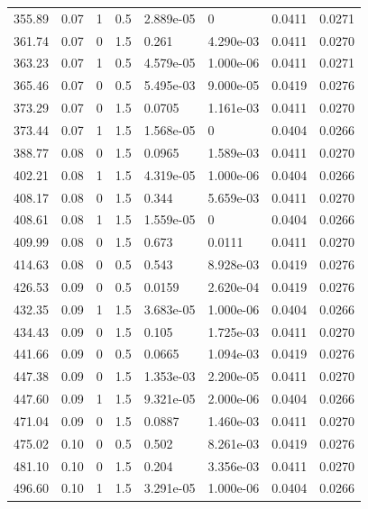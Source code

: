 \documentclass[preview]{standalone}
\begin{document}
{{{\begin{tabular}{L{1.2cm}C{1.2cm} C{0.3cm}C{0.5cm} C{1.4cm}C{1.4cm} C{1.4cm}C{1.4cm}}
  355.89  &  0.07  & 1     & 0.5 &  2.889e-05  & 0  & 0.0411 &  0.0271   \\ 
  361.74  &  0.07  & 0     & 1.5 &  0.261  & 4.290e-03  & 0.0411 &  0.0270   \\ 
  363.23  &  0.07  & 1     & 0.5 &  4.579e-05  & 1.000e-06  & 0.0411 &  0.0271   \\ 
  365.46  &  0.07  & 0     & 0.5 &  5.495e-03  & 9.000e-05  & 0.0419 &  0.0276   \\ 
  373.29  &  0.07  & 0     & 1.5 &  0.0705  & 1.161e-03  & 0.0411 &  0.0270   \\ 
  373.44  &  0.07  & 1     & 1.5 &  1.568e-05  & 0  & 0.0404 &  0.0266   \\ 
  388.77  &  0.08  & 0     & 1.5 &  0.0965  & 1.589e-03  & 0.0411 &  0.0270   \\ 
  402.21  &  0.08  & 1     & 1.5 &  4.319e-05  & 1.000e-06  & 0.0404 &  0.0266   \\ 
  408.17  &  0.08  & 0     & 1.5 &  0.344  & 5.659e-03  & 0.0411 &  0.0270   \\ 
  408.61  &  0.08  & 1     & 1.5 &  1.559e-05  & 0  & 0.0404 &  0.0266   \\ 
  409.99  &  0.08  & 0     & 1.5 &  0.673  & 0.0111  & 0.0411 &  0.0270   \\ 
  414.63  &  0.08  & 0     & 0.5 &  0.543  & 8.928e-03  & 0.0419 &  0.0276   \\ 
  426.53  &  0.09  & 0     & 0.5 &  0.0159  & 2.620e-04  & 0.0419 &  0.0276   \\ 
  432.35  &  0.09  & 1     & 1.5 &  3.683e-05  & 1.000e-06  & 0.0404 &  0.0266   \\ 
  434.43  &  0.09  & 0     & 1.5 &  0.105  & 1.725e-03  & 0.0411 &  0.0270   \\ 
  441.66  &  0.09  & 0     & 0.5 &  0.0665  & 1.094e-03  & 0.0419 &  0.0276   \\ 
  447.38  &  0.09  & 0     & 1.5 &  1.353e-03  & 2.200e-05  & 0.0411 &  0.0270   \\ 
  447.60  &  0.09  & 1     & 1.5 &  9.321e-05  & 2.000e-06  & 0.0404 &  0.0266   \\ 
  471.04  &  0.09  & 0     & 1.5 &  0.0887  & 1.460e-03  & 0.0411 &  0.0270   \\ 
  475.02  &  0.10  & 0     & 0.5 &  0.502  & 8.261e-03  & 0.0419 &  0.0276   \\ 
  481.10  &  0.10  & 0     & 1.5 &  0.204  & 3.356e-03  & 0.0411 &  0.0270   \\ 
  496.60  &  0.10  & 1     & 1.5 &  3.291e-05  & 1.000e-06  & 0.0404 &  0.0266   \\ 

\end{tabular}}}}
\end{document}
